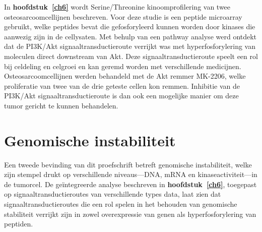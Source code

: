 In {\bf hoofdstuk~\ref{ch6}} wordt Serine/Threonine kinoomprofilering van twee osteosarcoomcellijnen beschreven. Voor deze studie is een peptide microarray gebruikt, welke peptides bevat die gefosforyleerd kunnen worden door kinases die aanwezig zijn in de cellysaten. Met behulp van een pathway analyse werd ontdekt dat de PI3K/Akt signaaltransductieroute verrijkt was met hyperfosforylering van moleculen direct downstream van Akt. Deze signaaltransductieroute speelt een rol bij celdeling en celgroei en kan geremd worden met verschillende medicijnen. Osteosarcoomcellijnen werden behandeld met de Akt remmer MK-2206, welke proliferatie van twee van de drie geteste cellen kon remmen. Inhibitie van de PI3K/Akt signaaltransductieroute is dan ook een mogelijke manier om deze tumor gericht te kunnen behandelen.

\section{Genomische instabiliteit}\label{genomische10}
Een tweede bevinding van dit proefschrift betreft genomische instabiliteit, welke zijn stempel drukt op verschillende niveaus---DNA, mRNA en kinaseactiviteit---in de tumorcel. De ge\"integreerde analyse beschreven in {\bf hoofdstuk~\ref{ch6}}, toegepast op signaaltransductieroutes van verschillende types data, laat zien dat signaaltransductieroutes die een rol spelen in het behouden van genomische stabiliteit verrijkt zijn in zowel overexpressie van genen als hyperfosforylering van peptiden. 
